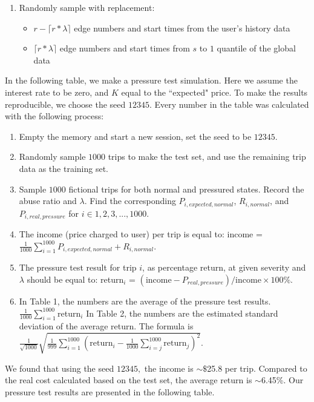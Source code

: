 \documentclass[12pt]{article}
\begin{document}
{{{{{{\begin{appendices}
\begin{enumerate}
        \item Randomly sample with replacement:
            \begin{itemize}
                \item $r-\lceil r*\lambda\rceil$ edge numbers and start times from the user's history data
                \item $\lceil r*\lambda\rceil$ edge numbers and start times from $s$ to $1$ quantile of the global data
            \end{itemize}
\end{enumerate}

In the following table, we make a pressure test simulation. Here we assume the interest rate to be zero, and $K$ equal to the ``expected" price. To make the results reproducible, we choose the seed $12345.$ Every number in the table was calculated with the following process:
\begin{enumerate}
    \item Empty the memory and start a new session, set the seed to be $12345.$
    \item Randomly sample $1000$ trips to make the test set, and use the remaining trip data as the training set.
    \item Sample $1000$ fictional trips for both normal and pressured states. Record the abuse ratio and $\lambda$. Find the corresponding $P_{i,expected, normal}$, $R_{i,normal}$, and $P_{i,real, pressure}$ for $i\in 1,2,3,...,1000$.
    \item The income (price charged to user) per trip is equal to: income = $\frac{1}{1000}\sum_{i=1}^{1000}P_{i,expected, normal}+R_{i, normal}$. 
    \item The pressure test result for trip $i$, as percentage return, at given severity and $\lambda$ should be equal to: return$_i$ = $({\text{income} - P_{real, pressure}}) / {\text{income}}\times 100\%.$
    \item In Table 1, the numbers are the average of the pressure test results. $\frac{1}{1000}\sum_{i=1}^{1000}$return$_i$ In Table 2, the numbers are the estimated standard deviation of the average return. The formula is $\frac{1}{\sqrt{1000}}\sqrt{\frac{1}{999}\sum_{i=1}^{1000}(\text{return}_i-\frac{1}{1000}\sum_{i=j}^{1000}\text{return}_j)^2}$.
\end{enumerate}




We found that using the seed $12345,$ the income is $\sim\$$25.8 per trip. Compared to the real cost calculated based on the test set, the average return is $\sim$6.45\%. Our pressure test results are presented in the following table.


\end{appendices}}}}}}}
\end{document}
